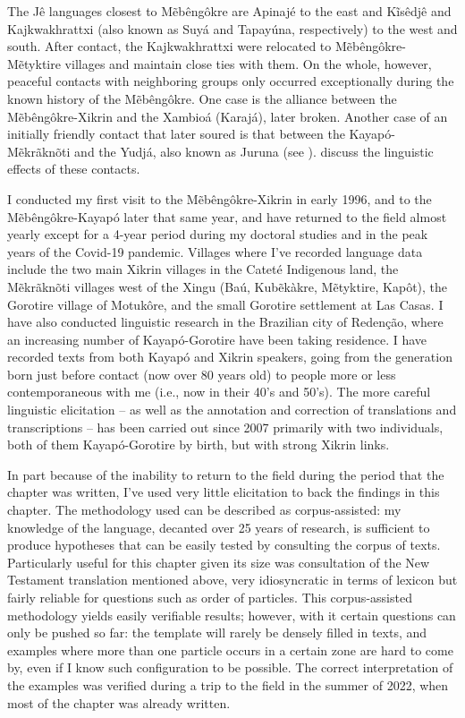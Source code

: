 \documentclass[output=paper]{langscibook}
\begin{document}
The Jê languages closest to Mẽbêngôkre are Apinajé to the east and Kĩsêdjê and Kajkwakhrattxi (also known as Suyá and Tapayúna, respectively) to the west and south. After contact, the Kajkwakhrattxi were relocated to Mẽbêngôkre-Mẽtyktire villages and maintain close ties with them. On the whole, however, peaceful contacts with neighboring groups only occurred exceptionally during the known history of the Mẽbêngôkre. One case is the alliance between the Mẽbêngôkre-Xikrin and the Xambioá (Karajá), later broken. Another case of an initially friendly contact that later soured is that between the Kayapó-Mẽkrãknõ\-ti and the Yudjá, also known as Juruna (see \citealt{verswijver:juruna}). \citet{salanova-nikulin:loans} discuss the linguistic effects of these contacts.

I conducted my first visit to the Mẽbêngôkre-Xikrin in early 1996, and to the Mẽbêngôkre-Kayapó later that same year, and have returned to the field almost yearly except for a 4-year period during my doctoral studies and in the peak years of the Covid-19 pandemic. Villages where I've recorded language data include the two main Xikrin villages in the Cateté Indigenous land, the Mẽkrãknõti villages west of the Xingu (Baú, Kubẽkàkre, Mẽtyktire, Kapôt), the Gorotire village of Motukôre, and the small Gorotire settlement at Las Casas. I have also conducted linguistic research in the Brazilian city of Redenção, where an increasing number of Kayapó-Gorotire have been taking residence. I have recorded texts from both Kayapó and Xikrin speakers, going from the generation born just before contact (now over 80 years old) to people more or less contemporaneous with me (i.e., now in their 40's and 50's). The more careful linguistic elicitation -- as well as the annotation and correction of translations and transcriptions -- has been carried out since 2007 primarily with two individuals, both of them Kayapó-Gorotire by birth, but with strong Xikrin links.

In part because of the inability to return to the field during the period that the chapter was written, I've used very little elicitation to back the findings in this chapter. The methodology used can be described as corpus-assisted: my knowledge of the language, decanted over 25 years of research, is sufficient to produce hypotheses that can be easily tested by consulting the corpus of texts. Particularly useful for this chapter given its size was consultation of the New Testament translation mentioned above, very idiosyncratic in terms of lexicon but fairly reliable for questions such as order of particles. This corpus-assisted methodology yields easily verifiable results; however, with it certain questions can only be pushed so far: the template will rarely be densely filled in texts, and examples where more than one particle occurs in a certain zone are hard to come by, even if I know such configuration to be possible. The correct interpretation of the examples was verified during a trip to the field in the summer of 2022, when most of the chapter was already written.
\end{document}

